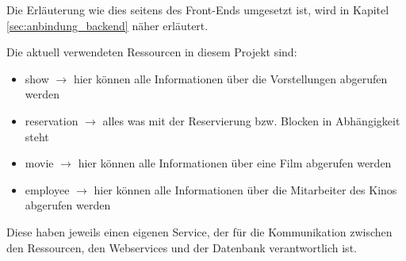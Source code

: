 Die Erläuterung wie dies seitens des Front-Ends umgesetzt ist, wird in Kapitel \vref{sec:anbindung_backend} näher erläutert.
 

Die aktuell verwendeten Ressourcen in diesem Projekt sind:
\begin{itemize}
	\item show $\rightarrow$ hier können alle Informationen über die Vorstellungen abgerufen werden
	\item reservation $\rightarrow$ alles was mit der Reservierung bzw. Blocken in Abhängigkeit steht 
	\item movie $\rightarrow$ hier können alle Informationen über eine Film abgerufen werden
	\item employee $\rightarrow$ hier können alle Informationen über die Mitarbeiter des Kinos abgerufen werden
\end{itemize} 

Diese haben jeweils einen eigenen Service, der für die Kommunikation zwischen den Ressourcen, den Webservices und der Datenbank verantwortlich ist. 